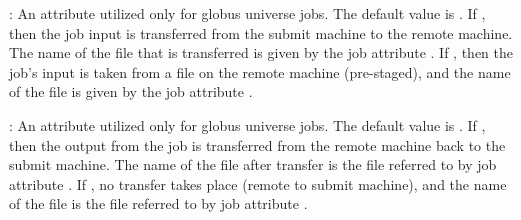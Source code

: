 \begin{description}
\item[\AdAttr{TransferIn}] :  
An attribute utilized only for globus universe jobs.
The default value is .
If , then the job input is transferred from the submit
machine to the remote machine.
The name of the file that is transferred is given by the
job attribute .
If , then the job's input is taken from a file on the
remote machine (pre-staged), and 
the name of the file is given by the job attribute .

\item[\AdAttr{TransferOut}] :  
An attribute utilized only for globus universe jobs.
The default value is .
If , then the output from the job
is transferred from the remote machine back to the submit machine.
The name of the file after transfer is the file referred to
by job attribute .
If , no transfer takes place (remote to submit machine),
and the name of the file is the file referred to
by job attribute .

\end{description}
